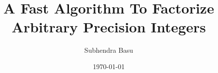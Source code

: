 \documentclass{article}
\title{A Fast Algorithm To Factorize Arbitrary Precision Integers}
\author{Subhendra Basu}
\date{\today}
\begin{document}
\maketitle

\begin{abstract}
\end{abstract}

\begin{thebibliography}{9}
\end{thebibliography}
\end{document}
